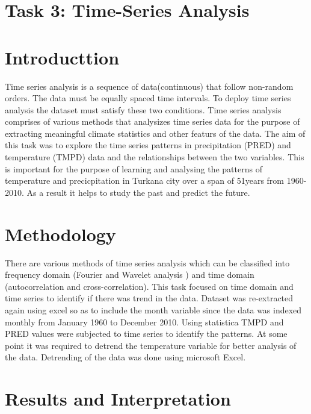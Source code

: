 \documentclass[12pt,a4paper]{article}
\begin{document}
\newpage
\section{Task 3: Time-Series Analysis }
\section{Introducttion}
Time series analysis is a sequence of data(continuous) that follow non-random orders. The data must be equally spaced time intervals. To deploy time series analysis the dataset must satisfy these two conditions. Time series analysis comprises of various methods that analysizes time series data for the purpose of extracting meaningful climate statistics and other featurs of the data. The aim of this task was to explore the time series patterns in precipitation (PRED) and temperature (TMPD) data and the relationships between the two variables. This is important for the purpose of learning and analysing the patterns of temperature and precicpitation in Turkana city over a span of 51years from 1960-2010. As a result it helps to study the past and predict the future.

\section{Methodology}
There are various methods of time series analysis which can be classified into frequency domain (Fourier and Wavelet analysis ) and time domain (autocorrelation and cross-correlation). This task focused on time domain and time series to identify if there was trend in the data. Dataset was re-extracted again using excel so as to include the month variable since the data was indexed monthly from January 1960 to December 2010. Using statistica TMPD and PRED values were subjected to time series to identify the patterns. At some point it was required to detrend the temperature variable for better analysis of the data. Detrending of the data was done using microsoft Excel.
\section{Results and Interpretation}
\end{document}

